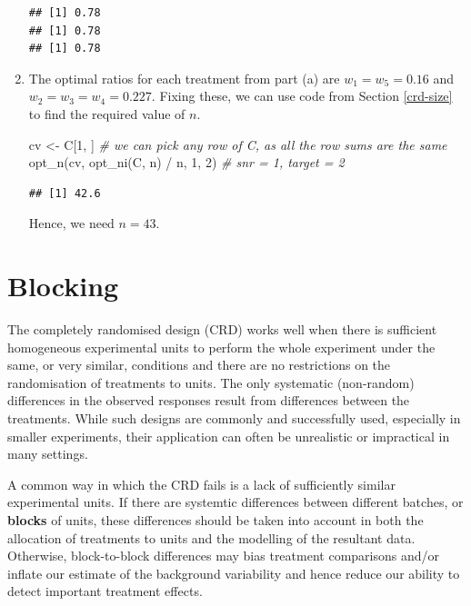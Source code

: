 \documentclass[
]{book}
\newenvironment{Shaded}{\begin{snugshade}}{\end{snugshade}}
\newcommand{\CommentTok}[1]{\textcolor[rgb]{0.56,0.35,0.01}{\textit{#1}}}
\newcommand{\DecValTok}[1]{\textcolor[rgb]{0.00,0.00,0.81}{#1}}
\newcommand{\FunctionTok}[1]{\textcolor[rgb]{0.00,0.00,0.00}{#1}}
\newcommand{\NormalTok}[1]{#1}
\newcommand{\OtherTok}[1]{\textcolor[rgb]{0.56,0.35,0.01}{#1}}
\newcommand{\SpecialCharTok}[1]{\textcolor[rgb]{0.00,0.00,0.00}{#1}}
\theoremstyle{definition}
\theoremstyle{definition}
\theoremstyle{definition}
\theoremstyle{definition}
\theoremstyle{remark}
\begin{document}
\begin{enumerate}
\begin{verbatim}
## [1] 0.78
## [1] 0.78
## [1] 0.78
\end{verbatim}
\item
  The optimal ratios for each treatment from part (a) are \(w_1 = w_5 = 0.16\) and \(w_2 = w_3 = w_4 = 0.227\). Fixing these, we can use code from Section \ref{crd-size} to find the required value of \(n\).

\begin{Shaded}
\begin{Highlighting}[]
\NormalTok{cv }\OtherTok{\textless{}{-}}\NormalTok{ C[}\DecValTok{1}\NormalTok{, ] }\CommentTok{\# we can pick any row of C, as all the row sums are the same}
\FunctionTok{opt\_n}\NormalTok{(cv, }\FunctionTok{opt\_ni}\NormalTok{(C, n) }\SpecialCharTok{/}\NormalTok{ n, }\DecValTok{1}\NormalTok{, }\DecValTok{2}\NormalTok{) }\CommentTok{\# snr = 1, target = 2}
\end{Highlighting}
\end{Shaded}

\begin{verbatim}
## [1] 42.6
\end{verbatim}

  Hence, we need \(n = 43\).
\end{enumerate}

\hypertarget{blocking}{%
\chapter{Blocking}\label{blocking}}

The completely randomised design (CRD) works well when there is sufficient homogeneous experimental units to perform the whole experiment under the same, or very similar, conditions and there are no restrictions on the randomisation of treatments to units. The only systematic (non-random) differences in the observed responses result from differences between the treatments. While such designs are commonly and successfully used, especially in smaller experiments, their application can often be unrealistic or impractical in many settings.

A common way in which the CRD fails is a lack of sufficiently similar experimental units. If there are systemtic differences between different batches, or \textbf{blocks} of units, these differences should be taken into account in both the allocation of treatments to units and the modelling of the resultant data. Otherwise, block-to-block differences may bias treatment comparisons and/or inflate our estimate of the background variability and hence reduce our ability to detect important treatment effects.
\end{document}
